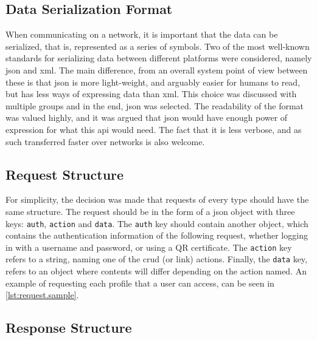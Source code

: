 \subsection{Data Serialization Format}

When communicating on a network, it is important that the data can be serialized, that is, represented as a series of symbols. Two of the most
well-known standards for serializing data between different platforms were considered, namely \ac{json} and \ac{xml}. The main difference, from
an overall system point of view between these is that \ac{json} is more light-weight, and arguably easier for humans to read, but has less 
ways of expressing data than \ac{xml}.\p
This choice was discussed with multiple groups and in the end, \ac{json} was selected. The readability of the format was valued highly, and it
was argued that \ac{json} would have enough power of expression for what this \ac{api} would need. The fact that it is less verbose, and as such
transferred faster over networks is also welcome.

\subsection{Request Structure}

For simplicity, the decision was made that requests of every type should have the same structure. The request should be in the form of
a \ac{json} object with three keys: \lstinline|auth|, \lstinline|action| and \lstinline|data|. The \lstinline|auth| key should contain another object, which
contains the authentication information of the following request, whether logging in with a username and password, or using a QR certificate. The
\lstinline|action| key refers to a string, naming one of the \ac{crud} (or link) actions. Finally, the \lstinline|data| key, refers to an object where contents
will differ depending on the action named. An example of requesting each profile that a user can access, can be seen in \autoref{lst:request.sample}.



\subsection{Response Structure}

